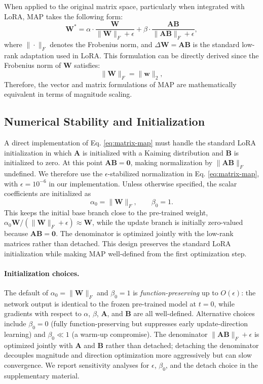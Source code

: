 When applied to the original matrix space, particularly when integrated with LoRA, MAP takes the following form:
\begin{equation}
\mathbf{W}^* = \alpha \cdot \frac{\mathbf{W}}{\|\mathbf{W}\|_F+\epsilon} + \beta \cdot \frac{\mathbf{A}\mathbf{B}}{\|\mathbf{A}\mathbf{B}\|_F+\epsilon},
\label{eq:matrix-map}
\end{equation}
where $\|\cdot\|_F$ denotes the Frobenius norm, and $\Delta \mathbf{W} = \mathbf{A}\mathbf{B}$ is the standard low-rank adaptation used in LoRA.
This formulation can be directly derived since the Frobenius norm of $\mathbf{W}$ satisfies:
\begin{equation}
\|\mathbf{W}\|_F = \|\mathbf{w}\|_2,
\end{equation}
Therefore, the vector and matrix formulations of MAP are mathematically equivalent in terms of magnitude scaling.

\subsection{Numerical Stability and Initialization}

A direct implementation of Eq. \ref{eq:matrix-map} must handle the standard LoRA initialization in which $\mathbf{A}$ is initialized with a Kaiming distribution and $\mathbf{B}$ is initialized to zero.
At this point $\mathbf{A}\mathbf{B}=\mathbf{0}$, making normalization by $\|\mathbf{A}\mathbf{B}\|_F$ undefined.
We therefore use the $\epsilon$-stabilized normalization in Eq. \ref{eq:matrix-map}, with $\epsilon=10^{-6}$ in our implementation.
Unless otherwise specified, the scalar coefficients are initialized as
\begin{equation}
\alpha_0=\|\mathbf{W}\|_F,\qquad \beta_0=1.
\end{equation}
This keeps the initial base branch close to the pre-trained weight,
$\alpha_0\mathbf{W}/(\|\mathbf{W}\|_F+\epsilon)\approx \mathbf{W}$,
while the update branch is initially zero-valued because $\mathbf{A}\mathbf{B}=\mathbf{0}$.
The denominator is optimized jointly with the low-rank matrices rather than detached.
This design preserves the standard LoRA initialization while making MAP well-defined from the first optimization step.

\paragraph{Initialization choices.}
The default of $\alpha_0=\|\mathbf{W}\|_F$ and $\beta_0=1$ is \emph{function-preserving} up to $O(\epsilon)$: the network output is identical to the frozen pre-trained model at $t=0$, while gradients with respect to $\alpha$, $\beta$, $\mathbf{A}$, and $\mathbf{B}$ are all well-defined.
Alternative choices include $\beta_0=0$ (fully function-preserving but suppresses early update-direction learning) and $\beta_0\ll 1$ (a warm-up compromise).
The denominator $\|\mathbf{A}\mathbf{B}\|_F+\epsilon$ is optimized jointly with $\mathbf{A}$ and $\mathbf{B}$ rather than detached; detaching the denominator decouples magnitude and direction optimization more aggressively but can slow convergence.
We report sensitivity analyses for $\epsilon$, $\beta_0$, and the detach choice in the supplementary material.

